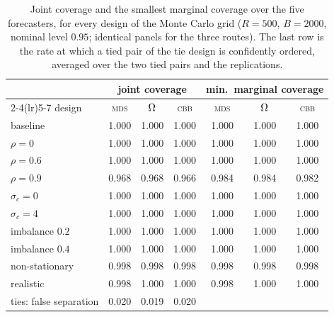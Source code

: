 \begin{table}[htb]
  \centering
  \caption[Monte Carlo coverage, full grid]{Joint coverage and the smallest marginal coverage over the five forecasters, for every design of the Monte Carlo grid ($R=500$, $B=2000$, nominal level $0.95$; identical panels for the three routes). The last row is the rate at which a tied pair of the tie design is confidently ordered, averaged over the two tied pairs and the replications.}
  \label{tab:app-mc-coverage}
  \small
  \begin{tabular}{lcccccc}
    \toprule
    & \multicolumn{3}{c}{joint coverage} & \multicolumn{3}{c}{min.\ marginal coverage}\\
    \cmidrule(lr){2-4}\cmidrule(lr){5-7}
    design & \textsc{mds} & $\Omega$ & \textsc{cbb} & \textsc{mds} & $\Omega$ & \textsc{cbb}\\
    \midrule
    baseline & 1.000 & 1.000 & 1.000 & 1.000 & 1.000 & 1.000\\
    $\rho=0$ & 1.000 & 1.000 & 1.000 & 1.000 & 1.000 & 1.000\\
    $\rho=0.6$ & 1.000 & 1.000 & 1.000 & 1.000 & 1.000 & 1.000\\
    $\rho=0.9$ & 0.968 & 0.968 & 0.966 & 0.984 & 0.984 & 0.982\\
    $\sigma_c=0$ & 1.000 & 1.000 & 1.000 & 1.000 & 1.000 & 1.000\\
    $\sigma_c=4$ & 1.000 & 1.000 & 1.000 & 1.000 & 1.000 & 1.000\\
    imbalance $0.2$ & 1.000 & 1.000 & 1.000 & 1.000 & 1.000 & 1.000\\
    imbalance $0.4$ & 1.000 & 1.000 & 1.000 & 1.000 & 1.000 & 1.000\\
    non-stationary & 0.998 & 0.998 & 0.998 & 0.998 & 0.998 & 0.998\\
    realistic & 0.998 & 1.000 & 1.000 & 0.998 & 1.000 & 1.000\\
    \midrule
    ties: false separation & 0.020 & 0.019 & 0.020 & & & \\
    \bottomrule
  \end{tabular}
\end{table}
